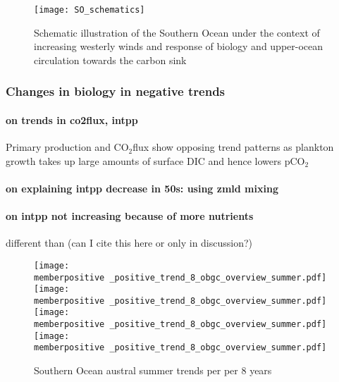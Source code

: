 \documentclass[12pt]{article}
\newcommand{\memberpositive}{m178_1985_1992} %
\begin{document}
\begin{figure}[h!]
	\centering
	\texttt{[image: SO\_schematics]}
	\caption{Schematic illustration of the Southern Ocean under the context of increasing westerly winds and response of biology and upper-ocean circulation towards the carbon sink}
	\label{fig:schematics_stronger_winds}
\end{figure}


\subsubsection{Changes in biology in negative trends}

\paragraph{on trends in co2flux, intpp} Primary production and CO$_2$flux show opposing trend patterns as plankton growth takes up large amounts of surface DIC and hence lowers pCO$_2$

\paragraph{on explaining intpp decrease in 50s: using zmld mixing} 

\paragraph{on intpp not increasing because of more nutrients} different than \citep{Lovenduski2005} (can I cite this here or only in discussion?)


\begin{figure}[h!]
	\texttt{[image: \\memberpositive \_positive\_trend\_8\_obgc\_overview\_summer.pdf]} %
	\texttt{[image: \\memberpositive \_positive\_trend\_8\_obgc\_overview\_summer.pdf]} %
	\texttt{[image: \\memberpositive \_positive\_trend\_8\_obgc\_overview\_summer.pdf]} %
	\texttt{[image: \\memberpositive \_positive\_trend\_8\_obgc\_overview\_summer.pdf]} %
	\caption{Southern Ocean austral summer trends per per 8 years}%
	\label{fig:co2flux_intpp_neg}
\end{figure}
\end{document}

